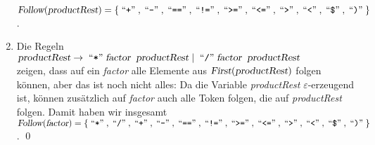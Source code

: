 \begin{enumerate}
      $\textsl{Follow}(\textsl{productRest}) = 
      \{ \quoted{+}, \quoted{-}, \quoted{==}, \quoted{!=}, \quoted{>=}, \quoted{<=}, \quoted{>}, \quoted{<}, \quoted{\symbol{36}}, \quoted{)} \}$.
\item Die Regeln 
      \\[0.2cm]
      \hspace*{1.3cm}
      $\textsl{productRest} \rightarrow \;\mbox{``\texttt{*}''}\; \textsl{factor}\;\;\textsl{productRest} 
                            \mid        \;\mbox{``\texttt{/}''}\; \textsl{factor}\;\;\textsl{productRest}$ 
      \\[0.2cm]
      zeigen, dass auf ein \textsl{factor} alle Elemente aus $\textsl{First}(\textsl{productRest})$
      folgen können, aber das ist noch nicht alles:  Da die Variable \textsl{productRest}
      $\varepsilon$-erzeugend ist, können zusätzlich auf \textsl{factor} auch
      alle Token folgen, die auf \textsl{productRest} folgen.  Damit haben wir insgesamt
      \\[0.2cm]
      \hspace*{1.3cm}
      $\textsl{Follow}(\textsl{factor}) = 
      \{ \quoted{*}, \quoted{/}, \quoted{+}, \quoted{-}, \quoted{==}, \quoted{!=}, \quoted{>=}, \quoted{<=}, \quoted{>}, \quoted{<}, \quoted{\symbol{36}}, \quoted{)} \}$.
      \qed
\end{enumerate}

